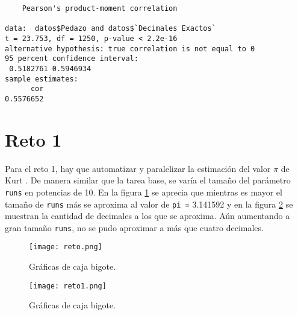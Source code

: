\documentclass[12pt,letterpaper]{article}
\begin{document}
\begin{verbatim}
	Pearson's product-moment correlation

data:  datos$Pedazo and datos$`Decimales Exactos`
t = 23.753, df = 1250, p-value < 2.2e-16
alternative hypothesis: true correlation is not equal to 0
95 percent confidence interval:
 0.5182761 0.5946934
sample estimates:
      cor 
0.5576652 
\end{verbatim}




\section{Reto 1}
Para el reto 1, hay que automatizar y paralelizar la estimación del valor $\pi$ de Kurt \cite{Kurt}. De manera similar que la tarea base, se varía el tamaño del parámetro \texttt{runs} en potencias de 10. En la figura \ref{box3} se aprecia que mientras es mayor el tamaño de \texttt{runs} más se aproxima al valor de \texttt{pi =} 3.141592 y en la figura \ref{box4} se muestran la cantidad de decimales a los que se aproxima. Aún aumentando a gran tamaño \texttt{runs}, no se pudo aproximar a más que cuatro decimales. 
\begin{figure}
	\centering
	\texttt{[image: reto.png]}
	\caption{Gráficas de caja bigote.}
	\label{box3}
\end{figure}

\begin{figure}
	\centering
	\texttt{[image: reto1.png]}
	\caption{Gráficas de caja bigote.}
	\label{box4}
\end{figure}
 

\end{document}
